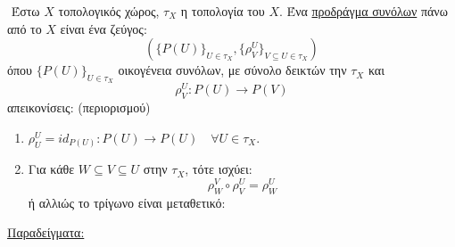 $ $\newline
Έστω $X$ τοπολογικός χώρος, $\tau_X$ η τοπολογία του $X$. Ένα \underline{προδράγμα συνόλων} πάνω από το $X$ είναι ένα ζεύγος:
$$\left( \{P(U)\}_{U \in \tau_X}, \{\rho^U_V\}_{V\subseteq U \in \tau_X}\right)$$ όπου $\{P(U)\}_{U \in \tau_X}$ οικογένεια συνόλων, με σύνολο δεικτών την $\tau_X$ και 
$$\rho^U_V : P(U) \longrightarrow P(V)$$ απεικονίσεις: (περιορισμού)
\begin{enumerate}
    \item $\rho^U_U = id_{P(U)}: P(U) \rightarrow P(U) \quad \forall U \in \tau_X$.
    \item Για κάθε $ W\subseteq V \subseteq U$ στην $\tau_X$, τότε ισχύει:
    $$\rho^V_W \circ \rho^U_V = \rho^U_W$$ ή αλλιώς το τρίγωνο είναι μεταθετικό:

    \begin{figure}[H]
        \centering
    \end{figure}
 
\end{enumerate}
\underline{Παραδείγματα:}
